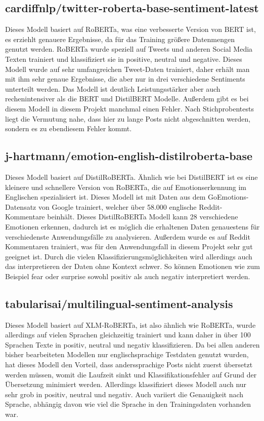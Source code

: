 \subsection{cardiffnlp/twitter-roberta-base-sentiment-latest}
Dieses Modell basiert auf RoBERTa, was eine verbesserte Version von BERT ist, es erziehlt genauere Ergebnisse, da für das Training größere Datenmengen genutzt werden. RoBERTa wurde speziell auf Tweets und anderen Social Media Texten trainiert und klassifiziert sie in positive, neutral und negative. Dieses Modell wurde auf sehr umfangreichen Tweet-Daten trainiert, daher erhält man mit ihm sehr genaue Ergebnisse, die aber nur in drei verschiedene Sentiments unterteilt werden. Das Modell ist deutlich Leistungsstärker aber auch rechenintensiver als die BERT und DistilBERT Modelle. Außerdem gibt es bei diesem Modell in diesem Projekt manchmal einen Fehler. Nach Stichprobentests liegt die Vermutung nahe, dass hier zu lange Posts nicht abgeschnitten werden, sondern es zu ebendiesem Fehler kommt.

\subsection{j-hartmann/emotion-english-distilroberta-base}
Dieses Modell basiert auf DistilRoBERTa. Ähnlich wie bei DistilBERT ist es eine kleinere und schnellere Version von RoBERTa, die auf Emotionserkennung im Englischen spezialisiert ist. Dieses Modell ist mit Daten aus dem GoEmotions-Datensatz von Google trainiert, welcher über 58.000 englische Reddit-Kommentare beinhält. Dieses DistilRoBERTa Modell kann 28 verschiedene Emotionen erkennen, dadurch ist es möglich die erhaltenen Daten genauestens für verschiedenste Anwendungsfälle zu analysieren. Außerdem wurde es auf Reddit Kommentaren trainiert, was für den Anwendungsfall in diesem Projekt sehr gut geeignet ist. Durch die vielen Klassifizierungsmöglichkeiten wird allerdings auch das interpretieren der Daten ohne Kontext schwer. So können Emotionen wie zum Beispiel fear oder surprise sowohl positiv als auch negativ interpretiert werden.

\subsection{tabularisai/multilingual-sentiment-analysis}
Dieses Modell basiert auf XLM-RoBERTa, ist also ähnlich wie RoBERTa, wurde allerdings auf vielen Sprachen gleichzeitig trainiert und kann daher in über 100 Sprachen Texte in positiv, neutral und negativ klassifizieren. Da bei allen anderen bisher bearbeiteten Modellen nur englischsprachige Testdaten genutzt wurden, hat dieses Modell den Vorteil, dass anderssprachige Posts nicht zuerst übersetzt werden müssen, womit die Laufzeit sinkt und Klassifikationsfehler auf Grund der Übersetzung minimiert werden. Allerdings klassifiziert dieses Modell auch nur sehr grob in positiv, neutral und negativ. Auch variiert die Genauigkeit nach Sprache, abhängig davon wie viel die Sprache in den Trainingsdaten vorhanden war.

